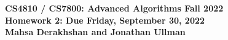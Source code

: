 \documentclass[11pt]{article}
\theoremstyle{definition}
\newcommand{\HWtitle}[2]{\begin{figure}[t!]{\bfseries \Large \color{DarkBlue}  \noindent CS4810 / CS7800: Advanced Algorithms \hfill Fall 2022} \\[0.2em] {\bfseries \Large \color{DarkBlue} Homework #1: Due {#2}} \\[1em] {\bfseries \large Mahsa Derakhshan and Jonathan Ullman}\\[1ex] \end{figure}}
\begin{document}

\HWtitle{2}{Friday, September 30, 2022}



\medskip

\renewcommand{\labelenumii}{{\bfseries \em \arabic{enumi}.\arabic{enumii}}}
\newcommand{\problemitem}{\renewcommand{\labelenumi}{{\bfseries \em Problem \arabic{enumi}}}\item}
\newcommand{\solutionitem}{\renewcommand{\labelenumi}{{\bfseries \em Solution \arabic{enumi}}}\addtocounter{enumi}{-1}\item}
\end{document}
